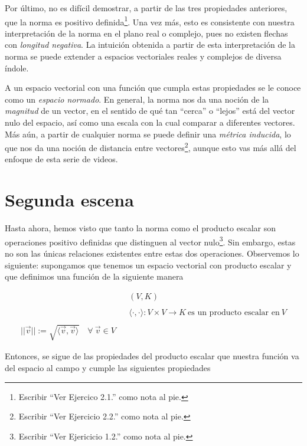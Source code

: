 \documentclass[12pt,dvipsnames]{article}
\numberwithin{equation}{section}
\begin{document}
Por último, no es difícil demostrar, a partir de las tres propiedades anteriores, que la norma es positivo definida\footnote{Escribir ``Ver Ejercico 2.1.'' como nota al pie.}. Una vez más, esto es consistente con nuestra interpretación de la norma en el plano real o complejo, pues no existen flechas con \emph{longitud negativa}. La intuición obtenida a partir de esta interpretación de la norma se puede extender a espacios vectoriales reales y complejos de diversa índole. 

A un espacio vectorial con una función que cumpla estas propiedades se le conoce como un \emph{espacio normado}. En general, la norma nos da una noción de la \emph{magnitud} de un vector, en el sentido de qué tan ``cerca'' o ``lejos'' está del vector nulo del espacio, así como una escala con la cual comparar a diferentes vectores. Más aún, a partir de cualquier norma se puede definir una \emph{métrica inducida}, lo que nos da una noción de distancia entre vectores\footnote{Escribir ``Ver Ejercicio 2.2.'' como nota al pie.}, aunque esto vas más allá del enfoque de esta serie de videos.



\newpage
\section{Segunda escena}

Hasta ahora, hemos visto que tanto la norma como el producto escalar son operaciones positivo definidas que distinguen al vector nulo\footnote{Escribir ``Ver Ejericicio 1.2.'' como nota al pie.}. Sin embargo, estas no son las únicas relaciones existentes entre estas dos operaciones. Observemos lo siguiente: supongamos que tenemos un espacio vectorial con producto escalar y que definimos una función de la siguiente manera

\begin{align*}
    & &(V,K) \\
    \\
    & &\langle \cdot , \cdot \rangle : V\times V\to K \ \text{es un producto escalar en} \ V\\
    \\
    ||\vec{v}||:=\sqrt{\langle \vec{v} , \vec{v} \rangle} \quad \forall \ \vec{v}\in V
\end{align*}

Entonces, se sigue de las propiedades del producto escalar que nuestra función va del espacio al campo y cumple las siguientes propiedades
\end{document}

